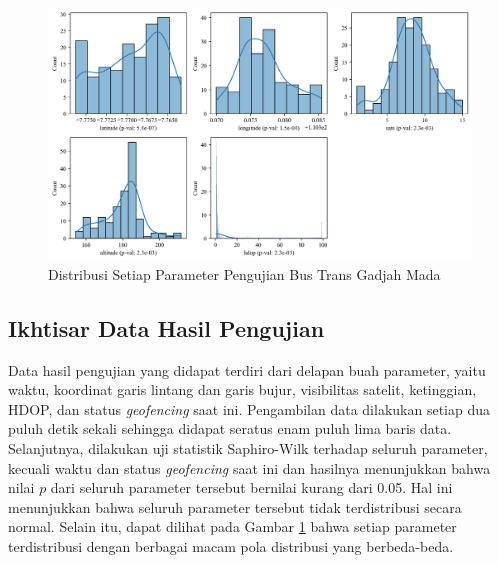 \begin{figure}[H]
	\centering
	\begin{adjustbox}{width=\textwidth}
		\includegraphics{contents/chapter-4/pengujian-bergerak/distribusi.png}
	\end{adjustbox}
	\caption{Distribusi Setiap Parameter Pengujian Bus Trans Gadjah Mada}
	\label{Fig: moving-distribusi}
\end{figure}

\subsection{Ikhtisar Data Hasil Pengujian}
Data hasil pengujian yang didapat terdiri dari delapan buah parameter, yaitu waktu, koordinat garis lintang dan garis bujur, visibilitas satelit, ketinggian, HDOP, dan status \textit{geofencing} saat ini. Pengambilan data dilakukan setiap dua puluh detik sekali sehingga didapat seratus enam puluh lima baris data. Selanjutnya, dilakukan uji statistik Saphiro-Wilk terhadap seluruh parameter, kecuali waktu dan status \textit{geofencing} saat ini dan hasilnya menunjukkan bahwa nilai $p$ dari seluruh parameter tersebut bernilai kurang dari 0.05. Hal ini menunjukkan bahwa seluruh parameter tersebut tidak terdistribusi secara normal. Selain itu, dapat dilihat pada Gambar \ref{Fig: moving-distribusi} bahwa setiap parameter terdistribusi dengan berbagai macam pola distribusi yang berbeda-beda.

